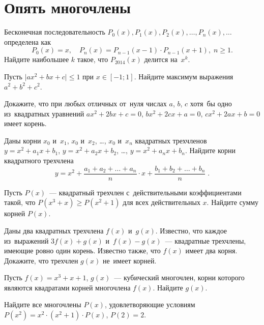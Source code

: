 
\section*{Опять многочлены}


\begin{problems}

\item
Бесконечная последовательность
$P_0(x), P_1(x), P_2(x), \ldots, P_n(x), \ldots$
определена как
\[
    P_0(x) = x
,\quad
    P_n(x) = P_{n-1}(x - 1) \cdot P_{n-1}(x + 1)
,\;
    n \geq 1
.\]
Найдите наибольшее $k$ такое, что $P_{2014}(x)$ делится на~$x^k$.

\item
Пусть $\lvert a x^2 + b x + c \rvert \leq 1$ при $x \in [-1; 1]$.
Найдите максимум выражения $a^2 + b^2 + c^2$.

\item
Докажите, что при любых отличных от~нуля числах $a$, $b$, $c$ хотя~бы одно
из~квадратных уравнений
$a x^2 + 2 b x + c = 0$, $b x^2 + 2 c x + a = 0$, $c x^2 + 2 a x + b = 0$
имеет корень.

\item
Даны корни $x_0$ и~$x_1$, $x_0$ и~$x_2$, \ldots, $x_0$ и~$x_n$ квадратных
трехчленов
$y = x^2 + a_1 x + b_1$, $y = x^2 + a_2 x + b_2$, \ldots,
$y = x^2 + a_n x + b_n$.
Найдите корни квадратного трехчлена
\[
    y
=
    x^2
    +
    \frac{a_1 + a_2 + \ldots + a_n}{n} \cdot x
    +
    \frac{b_1 + b_2 + \ldots + b_n}{n}
\; . \]

\item
Пусть $P(x)$~--- квадратный трехчлен с~действительными коэффициентами такой,
что $P(x^3 + x) \geq P(x^2 + 1)$ для всех действительных $x$.
Найдите сумму корней $P(x)$.

\item
Даны два квадратных трехчлена $f(x)$ и~$g(x)$.
Известно, что каждое из~выражений $3 f(x) + g(x)$ и~$f(x) - g(x)$~---
квадратные трехчлены, имеющие ровно один корень.
Известно также, что $f(x)$ имеет два корня.
Докажите, что трехчлен $g(x)$ не~имеет корней.

\item
Пусть $f(x) = x^3 + x + 1$, $g(x)$~--- кубический многочлен, корни которого
являются квадратами корней многочлена $f(x)$.
Найдите $g(x)$.

\item
Найдите все многочлены $P(x)$, удовлетворяющие условиям
$P(x^2) = x^2 \cdot (x^2 + 1) \cdot P(x)$, $P(2) = 2$.

\end{problems}

